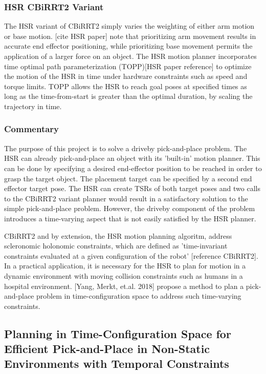 \documentclass[12pt]{article}
\begin{document}
        \subsubsection{HSR CBiRRT2 Variant}
            The HSR variant of CBiRRT2 simply varies the weighting of either arm motion or base motion. [cite HSR paper] note that prioritizing arm movement results in accurate end effector positioning, while prioritizing base movement permits the application of a larger force on an object. The HSR motion planner incorporates time optimal path parameterization (TOPP)[HSR paper reference] to optimize the motion of the HSR in time under hardware constraints such as speed and torque limits. TOPP allows the HSR to reach goal poses at specified times as long as the time-from-start is greater than the optimal duration, by scaling the trajectory in time.

        \subsubsection{Commentary}
            The purpose of this project is to solve a driveby pick-and-place problem. The HSR can already pick-and-place an object with its 'built-in' motion planner. This can be done by specifying a desired end-effector position to be reached in order to grasp the target object. The placement target can be specified by a second end effector target pose. The HSR can create TSRs of both target poses and two calls to the CBiRRT2 variant planner would result in a satisfactory solution to the simple pick-and-place problem. However, the driveby component of the problem introduces a time-varying aspect that is not easily satisfied by the HSR planner.

            \par CBiRRT2 and by extension, the HSR motion planning algoritm, address scleronomic holonomic constraints, which are defined as 'time-invariant constraints evaluated at a given configuration of the robot' [reference CBiRRT2]. In a practical application, it is necessary for the HSR to plan for motion in a dynamic environment with moving collision constraints such as humans in a hospital environment. [Yang, Merkt, et.al. 2018] propose a method to plan a pick-and-place problem in time-configuration space to address such time-varying constraints.

    \subsection{Planning in Time-Configuration Space for Efficient Pick-and-Place in Non-Static Environments with Temporal Constraints}
\end{document}
